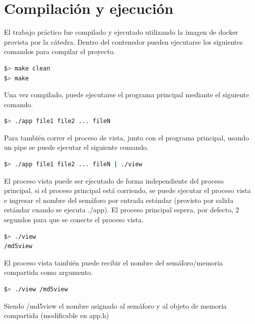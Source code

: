 \documentclass{article}
\begin{document}
\section{Compilación y ejecución}
El trabajo práctico fue compilado y ejecutado utilizando la imagen de docker provista por la cátedra. Dentro del contenedor pueden ejecutarse los siguientes comandos para compilar el proyecto.
\begin{lstlisting}[language=bash]
$> make clean
$> make
\end{lstlisting}
Una vez compilado, puede ejecutarse el programa principal mediante el siguiente comando.
\begin{lstlisting}[language=bash]
$> ./app file1 file2 ... fileN
\end{lstlisting}
Para también correr el proceso de vista, junto con el programa principal, usando un pipe se puede ejecutar el siguiente comando.
\begin{lstlisting}[language=bash]
$> ./app file1 file2 ... fileN | ./view
\end{lstlisting}
El proceso vista puede ser ejecutado de forma independiente del proceso principal, si el proceso principal está corriendo, se puede ejecutar el proceso vista e ingresar el nombre del semáforo por entrada estándar (provisto por salida estándar cuando se ejecuta ./app). El proceso principal espera, por defecto, 2 segundos para que se conecte el proceso vista.
\begin{lstlisting}[language=bash]
$> ./view
/md5view
\end{lstlisting}
El proceso vista también puede recibir el nombre del semáforo/memoria compartida como argumento.
\begin{lstlisting}[language=bash]
$> ./view /md5view
\end{lstlisting}
Siendo /md5view el nombre asignado al semáforo y al objeto de memoria compartida (modificable en app.h)
\end{document}
